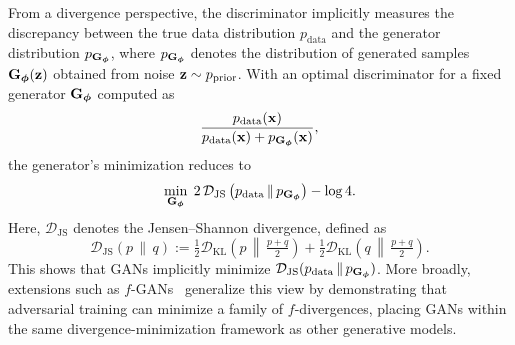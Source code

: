 From a divergence perspective, the discriminator implicitly measures the discrepancy between the true data distribution $p_{\mathrm{data}}$ 
and the generator distribution $p_{{\mathbf{G}}_{{\bm{\phi}}}}$, where $p_{{\mathbf{G}}_{{\bm{\phi}}}}$ denotes the distribution of generated samples ${\mathbf{G}}_{{\bm{\phi}}}({\mathbf{z}})$ obtained from noise ${\mathbf{z}} \sim p_{\mathrm{prior}}$. 
With an optimal discriminator for a fixed generator ${\mathbf{G}}_{{\bm{\phi}}}$ computed as
\begin{equation*}
     \frac{p_{\mathrm{data}}({\mathbf{x}})}{p_{\mathrm{data}}({\mathbf{x}}) + p_{{\mathbf{G}}_{{\bm{\phi}}}}({\mathbf{x}})},
\end{equation*}
the generator’s minimization reduces to
\begin{equation*}
    \min_{{\mathbf{G}}_{{\bm{\phi}}}} \; 2\,\mathcal{D}_\mathrm{JS} \left(p_{\mathrm{data}} \,\|\, p_{{\mathbf{G}}_{\bm{\phi}}}\right) - \log 4.
\end{equation*}
Here, $\mathcal{D}_\mathrm{JS}$ denotes the Jensen–Shannon divergence, defined as
\begin{equation*}
    \mathcal{D}_\mathrm{JS}(p \,\|\, q) 
    := \tfrac{1}{2} \mathcal{D}_\mathrm{KL} \left(p \,\middle\|\, \tfrac{p+q}{2}\right) 
    + \tfrac{1}{2} \mathcal{D}_\mathrm{KL} \left(q \,\middle\|\, \tfrac{p+q}{2}\right).
\end{equation*}
This shows that GANs implicitly minimize $\mathcal{D}_\mathrm{JS}(p_{\mathrm{data}} \,\|\, p_{{\mathbf{G}}_{\bm{\phi}}})$. 
More broadly, extensions such as $f$-GANs~\citep{nowozin2016f} generalize this view by demonstrating that adversarial training can minimize a family of $f$-divergences, 
placing GANs within the same divergence-minimization framework as other generative models.




